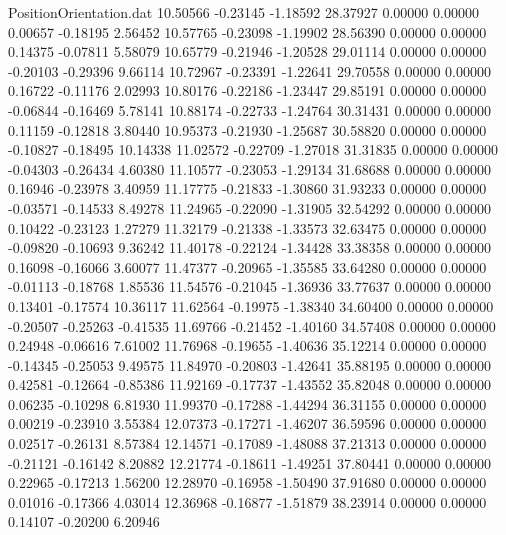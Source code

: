 \begin{filecontents}{PositionOrientation.dat}
  10.50566   -0.23145   -1.18592    28.37927    0.00000    0.00000    0.00657   -0.18195    2.56452
  10.57765   -0.23098   -1.19902    28.56390    0.00000    0.00000    0.14375   -0.07811    5.58079
  10.65779   -0.21946   -1.20528    29.01114    0.00000    0.00000   -0.20103   -0.29396    9.66114
  10.72967   -0.23391   -1.22641    29.70558    0.00000    0.00000    0.16722   -0.11176    2.02993
  10.80176   -0.22186   -1.23447    29.85191    0.00000    0.00000   -0.06844   -0.16469    5.78141
  10.88174   -0.22733   -1.24764    30.31431    0.00000    0.00000    0.11159   -0.12818    3.80440
  10.95373   -0.21930   -1.25687    30.58820    0.00000    0.00000   -0.10827   -0.18495   10.14338
  11.02572   -0.22709   -1.27018    31.31835    0.00000    0.00000   -0.04303   -0.26434    4.60380
  11.10577   -0.23053   -1.29134    31.68688    0.00000    0.00000    0.16946   -0.23978    3.40959
  11.17775   -0.21833   -1.30860    31.93233    0.00000    0.00000   -0.03571   -0.14533    8.49278
  11.24965   -0.22090   -1.31905    32.54292    0.00000    0.00000    0.10422   -0.23123    1.27279
  11.32179   -0.21338   -1.33573    32.63475    0.00000    0.00000   -0.09820   -0.10693    9.36242
  11.40178   -0.22124   -1.34428    33.38358    0.00000    0.00000    0.16098   -0.16066    3.60077
  11.47377   -0.20965   -1.35585    33.64280    0.00000    0.00000   -0.01113   -0.18768    1.85536
  11.54576   -0.21045   -1.36936    33.77637    0.00000    0.00000    0.13401   -0.17574   10.36117
  11.62564   -0.19975   -1.38340    34.60400    0.00000    0.00000   -0.20507   -0.25263   -0.41535
  11.69766   -0.21452   -1.40160    34.57408    0.00000    0.00000    0.24948   -0.06616    7.61002
  11.76968   -0.19655   -1.40636    35.12214    0.00000    0.00000   -0.14345   -0.25053    9.49575
  11.84970   -0.20803   -1.42641    35.88195    0.00000    0.00000    0.42581   -0.12664   -0.85386
  11.92169   -0.17737   -1.43552    35.82048    0.00000    0.00000    0.06235   -0.10298    6.81930
  11.99370   -0.17288   -1.44294    36.31155    0.00000    0.00000    0.00219   -0.23910    3.55384
  12.07373   -0.17271   -1.46207    36.59596    0.00000    0.00000    0.02517   -0.26131    8.57384
  12.14571   -0.17089   -1.48088    37.21313    0.00000    0.00000   -0.21121   -0.16142    8.20882
  12.21774   -0.18611   -1.49251    37.80441    0.00000    0.00000    0.22965   -0.17213    1.56200
  12.28970   -0.16958   -1.50490    37.91680    0.00000    0.00000    0.01016   -0.17366    4.03014
  12.36968   -0.16877   -1.51879    38.23914    0.00000    0.00000    0.14107   -0.20200    6.20946

\end{filecontents}
